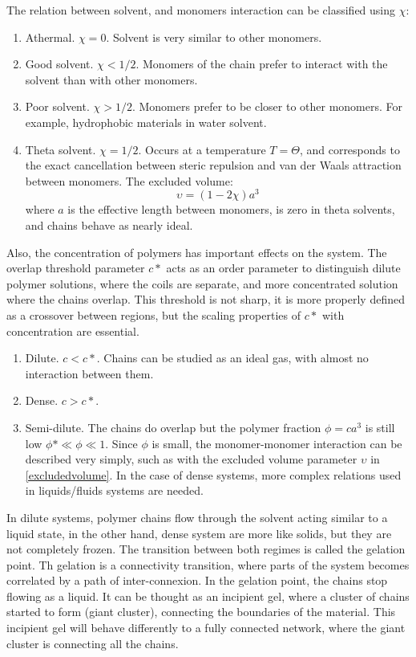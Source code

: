 The relation between solvent, and monomers interaction can be classified using
$\chi$:
\begin{enumerate}
  \item Athermal. $\chi=0$. Solvent is very similar to other monomers.
  \item Good solvent. $\chi<1/2$. Monomers of the chain prefer to interact with
  the solvent than with other monomers.
  \item Poor solvent. $\chi>1/2$. Monomers prefer to be closer to other
  monomers. For example, hydrophobic materials in water solvent.
  \item Theta solvent. $\chi=1/2$. Occurs at a temperature $T=\Theta$, and
  corresponds to the exact cancellation between steric repulsion and van der
  Waals attraction between monomers. The excluded volume:
  \begin{equation}\label{excludedvolume}
  \upsilon=(1-2\chi)a^3
  \end{equation}
  where $a$ is the effective length between monomers, is zero in theta solvents,
  and chains behave as nearly ideal.\citep{gennes_scaling_1979}
\end{enumerate}

Also, the concentration of polymers has important effects on the system. The
overlap threshold parameter $c*$ acts as an order parameter to distinguish dilute
polymer solutions, where the coils are separate, and more concentrated solution
where the chains overlap. This threshold is not sharp, it is more properly
defined as a crossover between regions, but the scaling properties of $c*$ with
concentration are essential.
\begin{enumerate}
  \item Dilute. $c<c*$. Chains can be studied as an ideal gas, with almost no
  interaction between them.
  \item Dense. $c>c*$.
  \item Semi-dilute. The chains do overlap but the polymer fraction
  $\phi=ca^3$ is still low $\phi*\ll\phi\ll1$. Since $\phi$ is small, the monomer-monomer interaction can
  be described very simply, such as with the excluded volume parameter
  $\upsilon$ in \ref{excludedvolume}. In the case of dense systems, more complex
  relations used in liquids/fluids systems are needed.
\end{enumerate}


In dilute systems, polymer chains flow through
the solvent acting similar to a liquid state, in the other hand, dense system
are more like solids, but they are not completely frozen. The transition between
both regimes is called the gelation point. Th gelation is a connectivity
transition, where parts of the system becomes correlated by a path of
inter-connexion. In the gelation point, the chains stop flowing as a liquid. It
can be thought as an incipient gel, where a cluster of chains started to form (giant cluster), connecting the boundaries of the
material. This incipient gel will behave differently to a fully connected
network, where the giant cluster is connecting all the chains.

